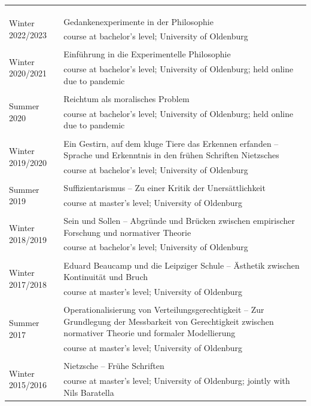 \documentclass[a4paper,10pt]{article}
\begin{document}
\begin{longtable}{p{2.5cm}p{11cm}}
\\
\\
\\
\\
\multirow{2}{2.5cm}{\footnotesize{Winter 2022/2023}} & Gedankenexperimente in der Philosophie\\
& \footnotesize{course at bachelor's level; University of Oldenburg}\\
\\
\multirow{2}{2.5cm}{\footnotesize{Winter 2020/2021}} & Einführung in die Experimentelle Philosophie\\
& \footnotesize{course at bachelor's level; University of Oldenburg; held online due to pandemic}\\
\\
\multirow{2}{2.5cm}{\footnotesize{Summer 2020}} & Reichtum als moralisches Problem\\
& \footnotesize{course at bachelor's level; University of Oldenburg; held online due to pandemic}\\
\\
\multirow{2}{2.5cm}{\footnotesize{Winter 2019/2020}} & Ein Gestirn, auf dem kluge Tiere das Erkennen erfanden -- Sprache und Erkenntnis in den frühen Schriften Nietzsches\\
& \footnotesize{course at bachelor's level; University of Oldenburg}\\
\\
\multirow{2}{2.5cm}{\footnotesize{Summer 2019}} & Suffizientarismus -- Zu einer Kritik der Unersättlichkeit\\
& \footnotesize{course at master's level; University of Oldenburg}\\
\\
\multirow{2}{2.5cm}{\footnotesize{Winter 2018/2019}} & Sein und Sollen -- Abgründe und Brücken zwischen empirischer Forschung und normativer Theorie\\
& \footnotesize{course at bachelor's level; University of Oldenburg}\\
\\
\multirow{2}{2.5cm}{\footnotesize{Winter 2017/2018}} & Eduard Beaucamp und die Leipziger Schule -- Ästhetik zwischen Kontinuität und Bruch\\
& \footnotesize{course at master's level; University of Oldenburg}\\
\\
\multirow{2}{2.5cm}{\footnotesize{Summer 2017}} & Operationalisierung von Verteilungsgerechtigkeit -- Zur Grundlegung der Messbarkeit von Gerechtigkeit zwischen normativer Theorie und formaler Modellierung\\
& \footnotesize{course at master's level; University of Oldenburg}\\
\\
\multirow{2}{2.5cm}{\footnotesize{Winter 2015/2016}} & Nietzsche -- Frühe Schriften\\
& \footnotesize{course at master's level; University of Oldenburg; jointly with Nils Baratella}\\
\end{longtable}
\end{document}
